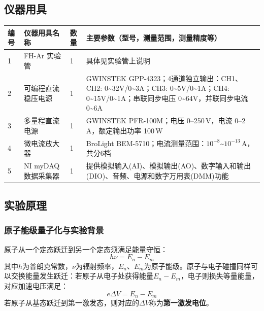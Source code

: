 \documentclass[dvipsnames, svgnames,a4paper,11pt]{article}
\begin{document}
\subsection{仪器用具}
\begin{table}[htbp]
	\centering
	\renewcommand\arraystretch{1.6}
	\begin{tabular}{p{}|p{}|p{}|p{}}
	\hline
	编号& 仪器用具名称 & 数量 &  主要参数（型号，测量范围，测量精度等） \\
	\hline
	1& FH-Ar 实验管 &1 & 具体见实验管上说明 \\
	2& 可编程直流稳压电源 &1 & GWINSTEK GPP-4323；4通道独立输出：CH1、CH2: 0\textasciitilde32V/0\textasciitilde3A；CH3: 0\textasciitilde5V/0\textasciitilde1A；CH4: 0\textasciitilde15V/0\textasciitilde1A；串联同步电压 0\textasciitilde64V，并联同步电流 0\textasciitilde6A \\
	3& 多量程直流电源 & 1 & GWINSTEK PFR-100M；电压 0--250\,V，电流 0--2\,A，额定输出功率 100\,W \\
	4& 微电流放大器 &1 & BroLight BEM-5710；电流测量范围：$10^{-8}$\textasciitilde$10^{-13}$\,A，共分6档 \\
	5& NI myDAQ 数据采集器 &1 & 提供模拟输入(AI)、模拟输出(AO)、数字输入和输出(DIO)、音频、电源和数字万用表(DMM)功能 \\
	\hline
\end{tabular}
\end{table}

\subsection{实验原理}

\subsubsection{原子能级量子化与实验背景}


原子从一个定态跃迁到另一个定态须满足能量守恒：
\begin{equation}
	h\nu = E_n - E_m
\end{equation}
其中$h$为普朗克常数，$\nu$为辐射频率，$E_n$、$E_m$为原子能级。原子与电子碰撞同样可以交换能量发生跃迁：若原子从电子处获得能量$E_n-E_m$，电子则损失等量能量，对应加速电压满足：
\begin{equation}
	e\Delta V = E_n - E_m
\end{equation}
若原子从基态跃迁到第一激发态，则对应的$\Delta V$称为\textbf{第一激发电位}。
\end{document}
